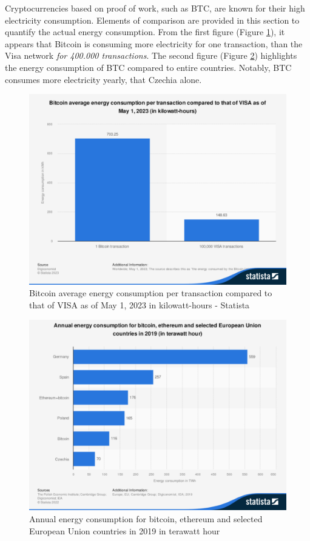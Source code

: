Cryptocurrencies based on proof of work, such as BTC, are known for their high electricity consumption. Elements of comparison 
are provided in this section to quantify the actual energy consumption. From the first figure (Figure \ref{F_btc_visa_energy}),
it appears that Bitcoin is consuming more electricity for one transaction, than the Visa network \emph{for 400.000 transactions}. The second figure (Figure 
\ref{F_countries_btc_energy}) highlights the energy consumption of BTC compared to entire countries. Notably, BTC consumes more electricity yearly, that Czechia 
alone.
\begin{figure}[ht]
    \centering
     \includegraphics[scale=0.33]{Images/btc_vs_visa_energy.pdf}
    \caption{Bitcoin average energy consumption per transaction compared to that of VISA as of May 1, 2023 in kilowatt-hours - Statista \cite{Digiconomist2023}}
    \label{F_btc_visa_energy}
    \end{figure}

    \begin{figure}
        \centering
         \includegraphics[scale=0.33]{Images/countries_BTC_ETH_energy.pdf}
        \caption{Annual energy consumption for bitcoin, ethereum and selected European Union countries in 2019 in terawatt hour \cite{PEI2021}}
        \label{F_countries_btc_energy}
        \end{figure}

